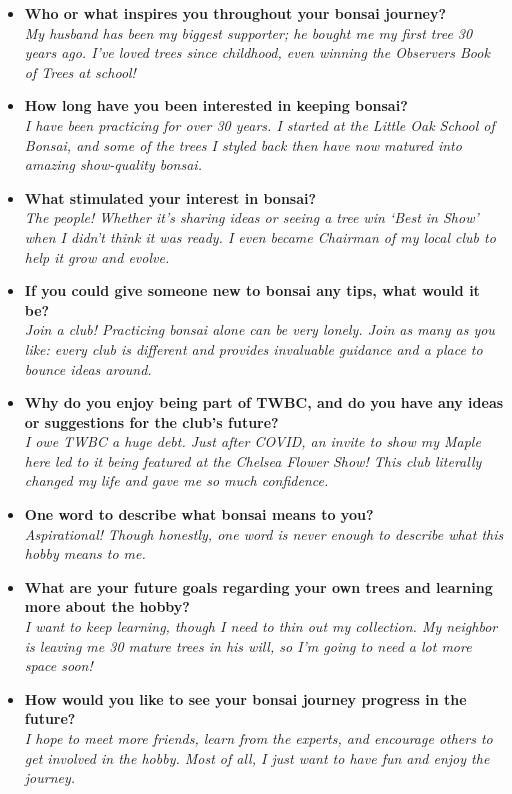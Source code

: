 \begin{itemize}
    \item \textbf{Who or what inspires you throughout your bonsai journey?}\\
    \emph{My husband has been my biggest supporter; he bought me my first tree 30 years ago. I’ve loved trees since childhood, even winning the Observers Book of Trees at school!}

    \item \textbf{How long have you been interested in keeping bonsai?}\\
    \emph{I have been practicing for over 30 years. I started at the Little Oak School of Bonsai, and some of the trees I styled back then have now matured into amazing show-quality bonsai.}

    \item \textbf{What stimulated your interest in bonsai?}\\
    \emph{The people! Whether it’s sharing ideas or seeing a tree win `Best in Show' when I didn't think it was ready. I even became Chairman of my local club to help it grow and evolve.}

    \item \textbf{If you could give someone new to bonsai any tips, what would it be?}\\
    \emph{Join a club! Practicing bonsai alone can be very lonely. Join as many as you like: every club is different and provides invaluable guidance and a place to bounce ideas around.}

    \item \textbf{Why do you enjoy being part of TWBC, and do you have any ideas or suggestions for the club's future?}\\
    \emph{I owe TWBC a huge debt. Just after COVID, an invite to show my Maple here led to it being featured at the Chelsea Flower Show! This club literally changed my life and gave me so much confidence.}

    \item \textbf{One word to describe what bonsai means to you?}\\
    \emph{Aspirational! Though honestly, one word is never enough to describe what this hobby means to me.}

    \item \textbf{What are your future goals regarding your own trees and learning more about the hobby?}\\
    \emph{I want to keep learning, though I need to thin out my collection. My neighbor is leaving me 30 mature trees in his will, so I’m going to need a lot more space soon!}

    \item \textbf{How would you like to see your bonsai journey progress in the future?}\\
    \emph{I hope to meet more friends, learn from the experts, and encourage others to get involved in the hobby. Most of all, I just want to have fun and enjoy the journey.}
\end{itemize}

